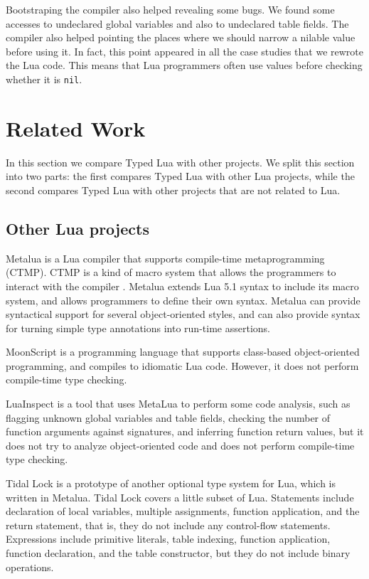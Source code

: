 Bootstraping the compiler also helped revealing some bugs.
We found some accesses to undeclared global variables and also
to undeclared table fields.
The compiler also helped pointing the places where we should narrow
a nilable value before using it.
In fact, this point appeared in all the case studies that we rewrote
the Lua code.
This means that Lua programmers often use values before checking
whether it is \texttt{nil}.

\section{Related Work}
\label{sec:relatedwork}

In this section we compare Typed Lua with other projects.
We split this section into two parts: the first compares Typed Lua
with other Lua projects, while the second compares Typed Lua with
other projects that are not related to Lua.

\subsection{Other Lua projects}

Metalua \citep{metalua} is a Lua compiler that supports compile-time
metaprogramming (CTMP).
CTMP is a kind of macro system that allows the programmers to interact
with the compiler \citep{fleutot2007contrasting}. 
Metalua extends Lua 5.1 syntax to include its macro system,
and allows programmers to define their own syntax.
Metalua can provide syntactical support for several object-oriented
styles, and can also provide syntax for turning simple type
annotations into run-time assertions.

MoonScript \citep{moonscript} is a programming language that supports
class-based object-oriented programming, and compiles to idiomatic
Lua code.
However, it does not perform compile-time type checking.

LuaInspect \citep{luainspect} is a tool that uses MetaLua to perform
some code analysis, such as flagging unknown global variables and
table fields, checking the number of function arguments against
signatures, and inferring function return values, but it does not
try to analyze object-oriented code and does not perform compile-time
type checking.

Tidal Lock \citep{tidallock} is a prototype of another optional type
system for Lua, which is written in Metalua.
Tidal Lock covers a little subset of Lua.
Statements include declaration of local variables, multiple assignments,
function application, and the return statement, that is, they do not
include any control-flow statements.
Expressions include primitive literals, table indexing, function application,
function declaration, and the table constructor, but they do not include
binary operations.

